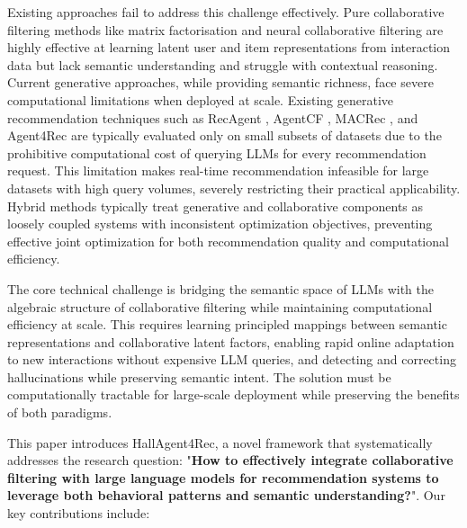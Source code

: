 \documentclass[acmsmall]{acmart}
\begin{document}
Existing approaches fail to address this challenge effectively. Pure collaborative filtering methods like matrix factorisation \cite{koren2009matrix} and neural collaborative filtering \cite{he2017neural} are highly effective at learning latent user and item representations from interaction data but lack semantic understanding and struggle with contextual reasoning. Current generative approaches, while providing semantic richness, face severe computational limitations when deployed at scale. Existing generative recommendation techniques such as RecAgent \cite{wang2025user}, AgentCF \cite{zhang2024agentcf}, MACRec \cite{wang2024macrec}, and Agent4Rec \cite{zhang2024generative} are typically evaluated only on small subsets of datasets due to the prohibitive computational cost of querying LLMs for every recommendation request. This limitation makes real-time recommendation infeasible for large datasets with high query volumes, severely restricting their practical applicability. Hybrid methods \cite{sun2021bert4rec, wu2024llm} typically treat generative and collaborative components as loosely coupled systems with inconsistent optimization objectives, preventing effective joint optimization for both recommendation quality and computational efficiency.

The core technical challenge is bridging the semantic space of LLMs with the algebraic structure of collaborative filtering while maintaining computational efficiency at scale. This requires learning principled mappings between semantic representations and collaborative latent factors, enabling rapid online adaptation to new interactions without expensive LLM queries, and detecting and correcting hallucinations while preserving semantic intent. The solution must be computationally tractable for large-scale deployment while preserving the benefits of both paradigms.

This paper introduces HallAgent4Rec, a novel framework that systematically addresses the research question: "\textbf{How to effectively integrate collaborative filtering with large language models for recommendation systems to leverage both behavioral patterns and semantic understanding?}". Our key contributions include:
\end{document}
